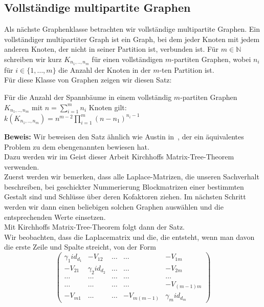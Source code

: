 \subsection{Vollständige multipartite Graphen}
Als nächste Graphenklasse betrachten wir vollständige multipartite Graphen.
Ein vollständiger multipartiter Graph ist ein Graph, bei dem jeder Knoten mit jedem anderen Knoten, der nicht in seiner Partition ist, verbunden ist. Für $m\in \mathbb{N}$ schreiben wir kurz $K_{n_1,..,n_m}$ für einen vollständigen $m$-partiten Graphen, wobei $n_i$ für $i \in \{1,\ldots,m\}$ die Anzahl der Knoten in der $m$-ten Partition ist.\\
Für diese Klasse von Graphen zeigen wir diesen Satz:
\begin{Tms}
 Für die Anzahl der Spannbäume in einem vollständig $m$-partiten Graphen $K_{n_1,..,n_m}$ mit $n=\sum_{i=1}^mn_i$ Knoten gilt:\\
 $\mathit{k}(K_{n_1,..,n_m})=n^{m-2}\prod_{i=1}^{m}(n-n_1)^{n_i-1}$
\end{Tms}
\textbf{Beweis:}
Wir beweisen den Satz ähnlich wie Austin in~\cite{austin_1960}, der ein äquivalentes Problem zu dem ebengenannten bewiesen hat.\\
Dazu werden wir im Geist dieser Arbeit Kirchhoffs Matrix-Tree-Theorem verwenden.\\
Zuerst werden wir bemerken, dass alle Laplace-Matrizen, die unseren Sachverhalt beschreiben, bei geschickter Nummerierung Blockmatrizen einer bestimmten Gestalt sind und Schlüsse über deren Kofaktoren ziehen. Im nächsten Schritt werden wir dann einen beliebigen solchen Graphen auswählen und die entsprechenden Werte einsetzen.\\
Mit Kirchhoffs Matrix-Tree-Theorem folgt dann der Satz.\\
Wir beobachten, dass die Laplacematrix und die, die entsteht, wenn man davon die erste Zeile und Spalte streicht, von der Form
\begin{equation}
\begin{pmatrix}
 {\gamma_1}id_{d_1}&-V_{12}&\ldots&\ldots&-V_{1m}\\
 -V_{21}&{\gamma_2}id_{d_2}&\ldots&\ldots&-V_{2m}\\
 \ldots&\ldots&\ldots&\ldots&\ldots\\
  \ldots&\ldots&\ldots&\ldots&-V_{(m-1)m}\\
 -V_{m1}&\ldots&\ldots&-V_{m(m-1)}&{\gamma_m}id_{d_m}
\end{pmatrix}
\end{equation}
